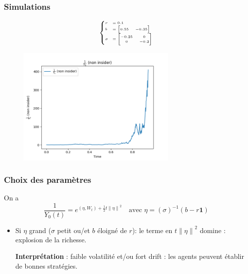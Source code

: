 \documentclass{beamer}
\begin{document}
\begin{frame}
\frametitle{Simulations}
\begin{figure}[H]
\begin{minipage}{.15\textwidth}
\begin{displaymath}
\tiny
\begin{cases}
r &= 0.1 \\
b &= \begin{bmatrix}
		0.55 & -0.35
	\end{bmatrix} \\
\sigma &= \begin{bmatrix}
			-0.25 & 0 \\
			0 & -0.2
		  \end{bmatrix}
\end{cases}
\end{displaymath}
\end{minipage}%
\begin{minipage}{.85\textwidth}
  \centering
    \includegraphics[width=0.7\textwidth]{images/simulation_2/wealth_non_insider.png}
\end{minipage}
\end{figure}
\end{frame}

\begin{frame}
\frametitle{Choix des paramètres}
\par On a 
\begin{displaymath}
\frac{1}{Y_0 \left( t \right)} = e^{ \left( \eta, W_{t} \right) + \frac{1}{2} t {\| \eta \|}^{2}} \quad \text{avec } \eta = (\sigma)^{-1} (b - r \textbf{1})
\end{displaymath}
\begin{itemize}
\item Si $\eta$ grand ($\sigma$ petit ou/et $b$ éloigné de $r$): le terme en $t {\| \eta \|}^{2}$ domine : explosion de la richesse.
\par \textbf{Interprétation} : faible volatilité et/ou fort drift : les agents peuvent établir de bonnes stratégies.
\end{itemize}
\end{frame}
\end{document}
